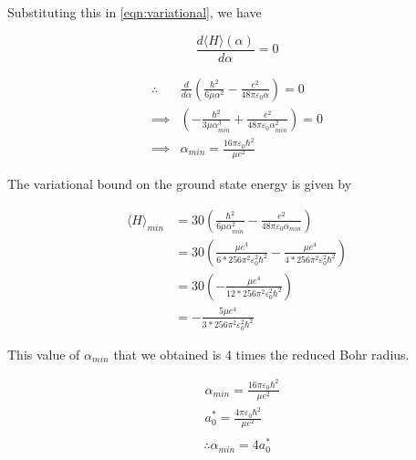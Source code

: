     Substituting this in \ref{eqn:variational}, we have

    \begin{equation*}
        \frac{d\langle H \rangle(\alpha)}{d\alpha} = 0 
    \end{equation*}

    \begin{equation*}
    \begin{split}
        \therefore & \frac{d}{d\alpha} \left( \frac{\hbar^{2}}{6\mu\alpha^2} - \frac{e^2}{48\pi\varepsilon_{0}\alpha} \right) = 0 \\
        \implies & \left( -\frac{\hbar^{2}}{3\mu\alpha_{min}^{3}} + \frac{e^2}{48\pi\varepsilon_{0}\alpha_{min}^{2}}\right) = 0 \\
        \implies & \alpha_{min} = \frac{16\pi\varepsilon_{0}\hbar^{2}}{\mu e^2}
    \end{split}
    \end{equation*}

    The variational bound on the ground state energy is given by

    \begin{equation*}
    \begin{split}
        \langle H \rangle_{min} & = 30 \left( \frac{\hbar^{2}}{6\mu\alpha_{min}^{2}} - \frac{e^2}{48\pi\varepsilon_{0}\alpha_{min}} \right) \\
        & = 30 \left( \frac{\mu e^4}{6*256\pi^{2}\varepsilon_{0}^{2}\hbar^{2}} - \frac{\mu e^4}{4*256\pi^{2}\varepsilon_{0}^{2}\hbar^{2}} \right) \\
        & = 30\left( -\frac{\mu e^4}{12*256\pi^{2}\varepsilon_{0}^{2}\hbar^{2}} \right) \\
        & =  -\frac{5\mu e^4}{3*256\pi^{2}\varepsilon_{0}^{2}\hbar^{2}}
    \end{split}
    \end{equation*}

    This value of $\alpha_{min}$ that we obtained is 4 times the reduced Bohr radius.

    \begin{equation*}
    \begin{split}
        & \alpha_{min} = \frac{16\pi\varepsilon_{0}\hbar^{2}}{\mu e^2} \\
        & a_{0}^{*} = \frac{4\pi\varepsilon_{0}\hbar^{2}}{\mu e^2} \\
    \end{split}
    \end{equation*}
    \begin{equation}
        \therefore \alpha_{min} = 4a_{0}^{*}
    \end{equation}

